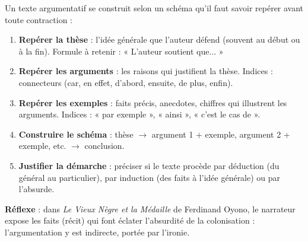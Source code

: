 \documentclass[11pt]{article}
\begin{document}
\begin{methode}
Un texte argumentatif se construit selon un schéma qu'il faut savoir repérer avant toute contraction :
\begin{enumerate}
\item \textbf{Repérer la thèse} : l'idée générale que l'auteur défend (souvent au début ou à la fin). Formule à retenir : « L'auteur soutient que... »
\item \textbf{Repérer les arguments} : les raisons qui justifient la thèse. Indices : connecteurs (car, en effet, d'abord, ensuite, de plus, enfin).
\item \textbf{Repérer les exemples} : faits précis, anecdotes, chiffres qui illustrent les arguments. Indices : « par exemple », « ainsi », « c'est le cas de ».
\item \textbf{Construire le schéma} : thèse $\rightarrow$ argument 1 + exemple, argument 2 + exemple, etc. $\rightarrow$ conclusion.
\item \textbf{Justifier la démarche} : préciser si le texte procède par déduction (du général au particulier), par induction (des faits à l'idée générale) ou par l'absurde.
\end{enumerate}
\textbf{Réflexe} : dans \emph{Le Vieux Nègre et la Médaille} de Ferdinand Oyono, le narrateur expose les faits (récit) qui font éclater l'absurdité de la colonisation : l'argumentation y est indirecte, portée par l'ironie.
\end{methode}
\end{document}
